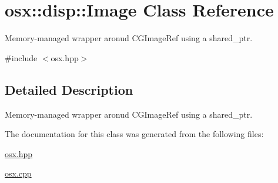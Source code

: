 \hypertarget{classosx_1_1disp_1_1_image}{\section{osx\-:\-:disp\-:\-:Image Class Reference}
\label{classosx_1_1disp_1_1_image}
}


Memory-\/managed wrapper aronud {\ttfamily C\-G\-Image\-Ref} using a {\ttfamily shared\-\_\-ptr}.  




{\ttfamily \#include $<$osx.\-hpp$>$}



\subsection{Detailed Description}
Memory-\/managed wrapper aronud {\ttfamily C\-G\-Image\-Ref} using a {\ttfamily shared\-\_\-ptr}. 



The documentation for this class was generated from the following files\-:\begin{DoxyCompactItemize}
\item 
\hyperlink{osx_8hpp}{osx.\-hpp}\item 
\hyperlink{osx_8cpp}{osx.\-cpp}\end{DoxyCompactItemize}
